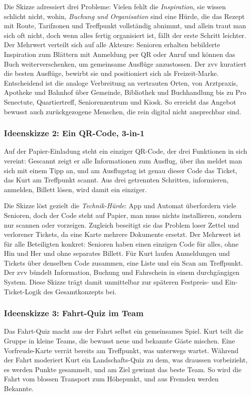 Die Skizze adressiert drei Probleme: Vielen fehlt die \emph{Inspiration}, sie wissen schlicht nicht, wohin, \emph{Buchung und Organisation} sind eine Hürde, die das Rezept mit Route, Tarifzonen und Treffpunkt vollständig abnimmt, und allein traut man sich oft nicht, doch wenn alles fertig organisiert ist, fällt der erste Schritt leichter. Der Mehrwert verteilt sich auf alle Akteure: Senioren erhalten bebilderte Inspiration zum Blättern mit Anmeldung per QR oder Anruf und können das Buch weiterverschenken, um gemeinsame Ausflüge anzustossen. Der \gls{zvv} kuratiert die besten Ausflüge, bewirbt sie und positioniert sich als Freizeit-Marke. Entscheidend ist die analoge Verbreitung an vertrauten Orten, von Arztpraxis, Apotheke und Bahnhof über Gemeinde, Bibliothek und Buchhandlung bis zu Pro Senectute, Quartiertreff, Seniorenzentrum und Kiosk. So erreicht das Angebot bewusst auch zurückgezogene Menschen, die rein digital nicht ansprechbar sind.

\subsubsection{Ideenskizze 2: Ein QR-Code, 3-in-1}
Auf der Papier-Einladung steht ein einziger QR-Code, der drei Funktionen in sich vereint: Gescannt zeigt er alle Informationen zum Ausflug, über ihn meldet man sich mit einem Tipp an, und am Ausflugstag ist genau dieser Code das Ticket, das Kurt am Treffpunkt scannt. Aus drei getrennten Schritten, informieren, anmelden, Billett lösen, wird damit ein einziger.

Die Skizze löst gezielt die \emph{Technik-Hürde}: App und Automat überfordern viele Senioren, doch der Code steht auf Papier, man muss nichts installieren, sondern nur scannen oder vorzeigen. Zugleich beseitigt sie das Problem loser Zettel und verlorener Tickets, da eine Karte mehrere Dokumente ersetzt. Der Mehrwert ist für alle Beteiligten konkret: Senioren haben einen einzigen Code für alles, ohne Hin und Her und ohne separates Billett. Für Kurt laufen Anmeldungen und Tickets über denselben Code zusammen, eine Liste und ein Scan am Treffpunkt. Der \gls{zvv} bündelt Information, Buchung und Fahrschein in einem durchgängigen System. Diese Skizze trägt damit unmittelbar zur späteren Festpreis- und Ein-Ticket-Logik des Gesamtkonzepts bei.

\subsubsection{Ideenskizze 3: Fahrt-Quiz im Team}
Das Fahrt-Quiz macht aus der Fahrt selbst ein gemeinsames Spiel. Kurt teilt die Gruppe in kleine Teams, die bewusst neue und bekannte Gäste mischen. Eine Vorfreude-Karte verrät bereits am Treffpunkt, was unterwegs wartet. Während der Fahrt moderiert Kurt ein Landschafts-Quiz zu dem, was draussen vorbeizieht, es werden Punkte gesammelt, und am Ziel gewinnt das beste Team. So wird die Fahrt vom blossen Transport zum Höhepunkt, und aus Fremden werden Bekannte.

